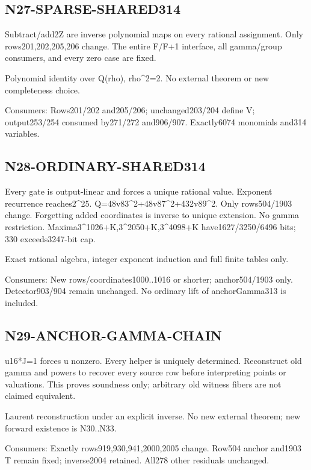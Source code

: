 \documentclass{article}
\begin{document}
\subsection{N27-SPARSE-SHARED314}
\label{outline:r4-n27-sparse-shared314}
Subtract/add2Z are inverse polynomial maps on every rational assignment. Only rows201,202,205,206 change. The entire F/F+1 interface, all gamma/group consumers, and every zero case are fixed.
\par Polynomial identity over Q(rho), rho\textasciicircum{}2=2. No external theorem or new completeness choice.
\par Consumers: Rows201/202 and205/206; unchanged203/204 define V; output253/254 consumed by271/272 and906/907. Exactly6074 monomials and314 variables.
\subsection{N28-ORDINARY-SHARED314}
\label{outline:r4-n28-ordinary-shared314}
Every gate is output-linear and forces a unique rational value. Exponent recurrence reaches2\textasciicircum{}25. Q=48v83\textasciicircum{}2+48v87\textasciicircum{}2+432v89\textasciicircum{}2. Only rows504/1903 change. Forgetting added coordinates is inverse to unique extension. No gamma restriction. Maxima3\textasciicircum{}1026+K,3\textasciicircum{}2050+K,3\textasciicircum{}4098+K have1627/3250/6496 bits; 330 exceeds3247-bit cap.
\par Exact rational algebra, integer exponent induction and full finite tables only.
\par Consumers: New rows/coordinates1000..1016 or shorter; anchor504/1903 only. Detector903/904 remain unchanged. No ordinary lift of anchorGamma313 is included.
\subsection{N29-ANCHOR-GAMMA-CHAIN}
\label{outline:r4-n29-anchor-gamma-chain}
u16*J=1 forces u nonzero. Every helper is uniquely determined. Reconstruct old gamma and powers to recover every source row before interpreting points or valuations. This proves soundness only; arbitrary old witness fibers are not claimed equivalent.
\par Laurent reconstruction under an explicit inverse. No new external theorem; new forward existence is N30..N33.
\par Consumers: Exactly rows919,930,941,2000,2005 change. Row504 anchor and1903 T remain fixed; inverse2004 retained. All278 other residuals unchanged.
\end{document}

